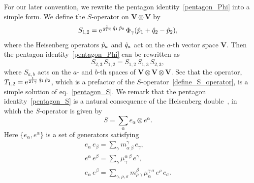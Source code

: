 \documentclass[12pt]{article}
\numberwithin{equation}{section}
\begin{document}
For our later convention, we rewrite the pentagon
identity~\eqref{pentagon_Phi}
into a
simple form.
We   define the $S$-operator  on $\mathbf{V}\otimes\mathbf{V}$ by
\begin{equation}
  \label{define_S_operator}
  S_{1,2}
  =
  \mathrm{e}^{
    \frac{1}{2 \,  \mathrm{i}\, \gamma} \,
    \Hat{q}_1 \, \Hat{p}_2
    } \,
  \Phi_\gamma (\Hat{p}_1 + \Hat{q}_2 - \Hat{p}_2) ,
\end{equation}
where the Heisenberg operators $\Hat{p}_a$
and $\Hat{q}_a$ act on the $a$-th  vector
space $\mathbf{V}$.
Then the pentagon identity~\eqref{pentagon_Phi} can be
rewritten as
\begin{equation}
  \label{pentagon_S}
  S_{2,3} \, S_{1,2}
  =
  S_{1,2} \, S_{1,3} \, S_{2,3} ,
\end{equation}
where $S_{a,b}$ acts on the $a$- and $b$-th spaces of
$\mathbf{V}\otimes \mathbf{V} \otimes \mathbf{V}$.
See that
the  operator,
$
  T_{1,2}
  =
  \mathrm{e}^{\frac{1}{2 \, \mathrm{i} \, \gamma } \, \Hat{q}_1 \,
    \Hat{p}_2}  
$,
which is a prefactor of the $S$-operator~\eqref{define_S_operator},
is a simple solution of  eq.~\eqref{pentagon_S}.
We remark  that
the pentagon identity~\eqref{pentagon_S} is a natural consequence  of
the Heisenberg double~\cite{Kasha95b,Kasha96a}, in which the $S$-operator is
given by
\begin{equation*}
  S = \sum_\alpha e_\alpha \otimes e^\alpha .
\end{equation*}
Here $\{ e_\alpha , e^\alpha \}$ is a set of generators satisfying
\begin{gather*}
  e_\alpha \, e_\beta = \sum_\gamma m^\gamma_{\alpha ~ \beta} \, e_\gamma ,
  \\
  e^\alpha \, e^\beta
  = \sum_\gamma  \mu_\gamma^{\alpha ~ \beta} \, e^\gamma ,
  \\
  e_\alpha \, e^\beta =
  \sum_{\gamma, \rho, \sigma}
  m^\beta_{\rho ~ \gamma} \, \mu_\alpha^{\gamma ~ \sigma} \,
  e^\rho \, e_\sigma .
\end{gather*}
\end{document}
